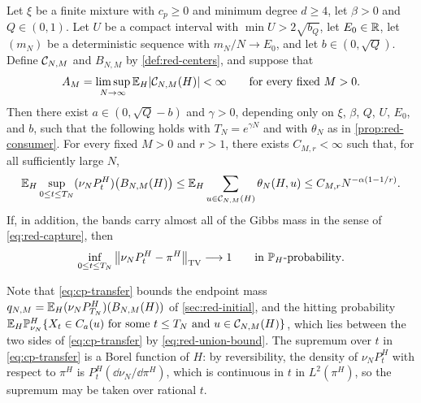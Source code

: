\begin{proposition}\label{prop:cp-transfer}
Let $\xi$ be a finite mixture with $c_p\ge0$ and minimum degree $d\ge4$, let $\beta>0$ and $Q\in(0,1)$. Let $U$ be a compact interval with $\min U>2\sqrt{b_Q}$, let $E_0\in\mathbb R$, let $(m_N)$ be a deterministic sequence with $m_N/N\to E_0$, and let $b\in(0,\sqrt Q)$. Define $\mathcal C_{N,M}$ and $B_{N,M}$ by \cref{def:red-centers}, and suppose that
\begin{equation*}
A_M=\limsup_{N\to\infty}\mathbb E_H|\mathcal C_{N,M}(H)|<\infty\qquad\text{for every fixed }M>0.
\end{equation*}
Then there exist $a\in(0,\sqrt Q-b)$ and $\gamma>0$, depending only on $\xi$, $\beta$, $Q$, $U$, $E_0$, and $b$, such that the following holds with $T_N=e^{\gamma N}$ and with $\theta_N$ as in \cref{prop:red-consumer}. For every fixed $M>0$ and $r>1$, there exists $C_{M,r}<\infty$ such that, for all sufficiently large $N$,
\begin{equation}\label{eq:cp-transfer}
\mathbb E_H\sup_{0\le t\le T_N}(\nu_NP^H_t)\bigl(B_{N,M}(H)\bigr)\le\mathbb E_H\sum_{u\in\mathcal C_{N,M}(H)}\theta_N(H,u)\le C_{M,r}N^{-\alpha(1-1/r)}.
\end{equation}
If, in addition, the bands carry almost all of the Gibbs mass in the sense of \eqref{eq:red-capture}, then
\begin{equation*}
\inf_{0\le t\le T_N}\left\lVert\nu_NP^H_t-\pi^H\right\rVert_{\mathrm{TV}}\longrightarrow1\qquad\text{in }\mathbb P_H\text{-probability}.
\end{equation*}
\end{proposition}

Note that \eqref{eq:cp-transfer} bounds the endpoint mass $q_{N,M}=\mathbb E_H(\nu_NP^H_{T_N})(B_{N,M}(H))$ of \cref{sec:red-initial}, and the hitting probability $\mathbb E_H\mathbb P^H_{\nu_N}\{X_t\in C_a(u)\text{ for some }t\le T_N\text{ and }u\in\mathcal C_{N,M}(H)\}$, which lies between the two sides of \eqref{eq:cp-transfer} by \eqref{eq:red-union-bound}. The supremum over $t$ in \eqref{eq:cp-transfer} is a Borel function of $H$: by reversibility, the density of $\nu_NP^H_t$ with respect to $\pi^H$ is $P^H_t(\dd\nu_N/\dd\pi^H)$, which is continuous in $t$ in $L^2(\pi^H)$, so the supremum may be taken over rational $t$.

